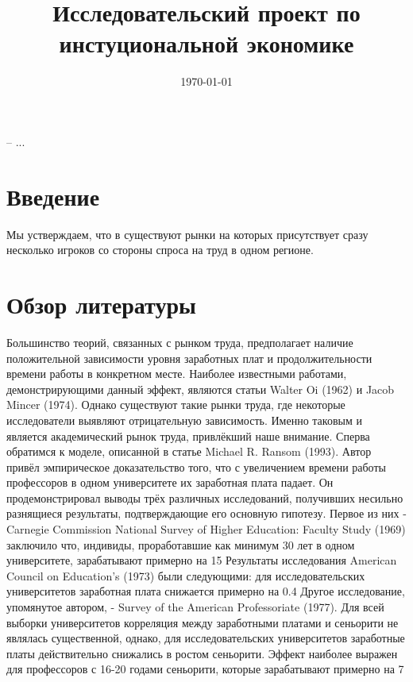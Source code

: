 \documentclass[a4paper, 12pt]{article}
\title{Исследовательский проект по инстуциональной экономике}
\date{\today}
\theoremstyle{definition}
\theoremstyle{plain}
\begin{document}
\maketitle

-- ...

\section{Введение}
Мы устверждаем, что в существуют рынки на которых присутствует сразу несколько игроков со стороны спроса на труд в одном регионе. 
\section{Обзор литературы}

Большинство теорий, связанных с рынком труда, предполагает наличие положительной зависимости уровня заработных плат и продолжительности времени работы в конкретном месте. Наиболее известными работами, демонстрирующими данный эффект, являются статьи Walter Oi (1962) и Jacob Mincer (1974). Однако существуют такие рынки труда, где некоторые исследователи выявляют отрицательную зависимость. Именно таковым и является академический рынок труда, привлёкший наше внимание. 
	Сперва обратимся к моделе, описанной в статье Michael R. Ransom (1993). Автор привёл эмпирическое доказательство того, что с увеличением времени работы профессоров в одном университете их заработная плата падает. Он продемонстрировал выводы трёх различных исследований, получивших несильно разнящиеся результаты, подтверждающие его основную гипотезу. Первое из них - Carnegie Commission National Survey of Higher Education: Faculty Study (1969) заключило что, индивиды, проработавшие как минимум 30 лет в одном университете, зарабатывают примерно на 15%
	Результаты исследования American Council on Education's (1973) были следующими:  для исследовательских университетов заработная плата снижается примерно на 0.4%
	Другое исследование, упомянутое автором, - Survey of the American Professoriate (1977). Для всей выборки университетов корреляция между заработными платами и сеньорити не являлась существенной, однако, для исследовательских университетов заработные платы действительно снижались в ростом сеньорити. Эффект наиболее выражен для профессоров с 16-20 годами сеньорити, которые зарабатывают примерно на 7%
\end{document}
